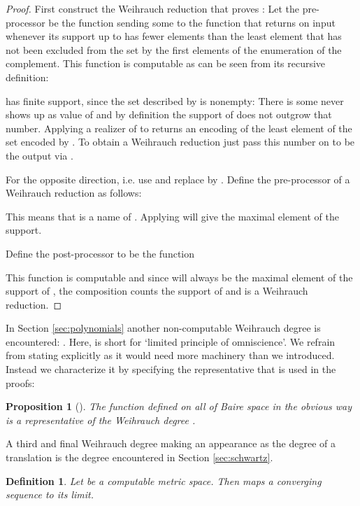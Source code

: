 \documentclass{eptcs-modified}
\newtheorem{definition}[theorem]{Definition}
\newtheorem{proposition}[theorem]{Proposition}
\begin{document}
			\begin{proof}
				First construct the Weihrauch reduction that proves :
				Let the pre-processor  be the function sending some  to the function that returns  on input  whenever its support up to  has fewer elements than the least element that has not been excluded from the set by the first  elements of the enumeration of the complement.
				This function is computable as can be seen from its recursive definition:
				
				 has finite support, since the set described by  is nonempty:
				There is some  never shows up as value of  and by definition the support of  does not outgrow that number.
				Applying a realizer of  to  returns an encoding of the least element of the set encoded by .
				To obtain a Weihrauch reduction just pass this number on to be the output via .
				
				For the opposite direction, i.e.  use  and replace  by .
				Define the pre-processor  of a Weihrauch reduction  as follows:
				
				This means that  is a  name of .
				Applying  will give the maximal element of the support.

				Define the post-processor  to be the function
				
				This function is computable and since  will always be the maximal element of the support of , the composition counts the support of  and is a Weihrauch reduction.
			\end{proof}

			In Section \ref{sec:polynomials} another non-computable Weihrauch degree is encountered: .
			Here,  is short for \lq limited principle of omniscience\rq.
			We refrain from stating  explicitly as it would need more machinery than we introduced.
			Instead we characterize it by specifying the representative that is used in the proofs:
			\begin{proposition}[{\cite[Korollar 3.1.4.6]{paulymaster}}]\label{resu:lpo*}
				The function  defined on all of Baire space in the obvious way is a representative of the Weihrauch degree .
			\end{proposition}

			A third and final Weihrauch degree making an appearance as the degree of a translation is the degree  encountered in Section \ref{sec:schwartz}.

			\begin{definition}
				Let  be a computable metric space.
				Then  maps a converging sequence to its limit.
			\end{definition}
\end{document}
